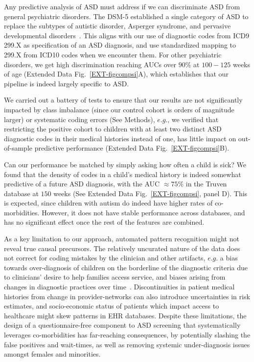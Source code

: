 \documentclass[3p,super,numbers,sort&compress,preprint,10pt]{elsarticle}
\def\treatment{positive\xspace}
\begin{document}
Any predictive analysis of ASD must address if we can
discriminate  ASD from  general psychiatric disorders.
The DSM-5 established a single category of ASD to replace
the subtypes of autistic disorder, Asperger syndrome, and pervasive
developmental disorders~\cite{hyman2020identification}. This aligns with our use of diagnostic codes from ICD9 299.X as specification of an ASD diagnosis, and use standardized mapping to 299.X from ICD10 codes when we encounter them. For other psychiatric disorders, we get  high discrimination reaching AUCs over $90\%$ at $100 -125$ weeks of age (Extended Data Fig.~\ref{EXT-figcompsi}A), which establishes that our pipeline is indeed largely specific to ASD.
%

We carried out a battery of tests to ensure that our results are not significantly impacted
by class imbalance (since our control cohort is orders of magnitude larger) or systematic coding errors (See Methods), $e.g.$, we verified that restricting the \treatment cohort to children with at least two  distinct ASD diagnostic codes in their medical histories instead of one, has little impact on  out-of-sample predictive performance (Extended Data Fig.~\ref{EXT-figcompsi}B).

 Can our performance be matched by simply asking how often a child is sick? We  found that the density of  codes in a child's medical history is indeed somewhat  predictive of a future ASD diagnosis, with the AUC  $\approx 75\%$ in the Truven database at $150$ weeks (See Extended Data Fig.~\ref{EXT-figcompsi}, panel D). This is expected, since children with autism do indeed have higher rates of co-morbidities. However, it does not have stable  performance across databases, and has no significant effect once the rest of the features are combined.
 
 As a key limitation to our approach, automated pattern recognition  might not reveal true causal precursors.
The relatively uncurated nature of the  data does not correct for coding mistakes by the clinician and other artifacts, $e.g.$   a bias towards over-diagnosis of  children on the borderline of the diagnostic criteria due to clinicians' desire to help families access service, and biases arising from changes in diagnostic practices over time~\cite{10.1001/jamapsychiatry.2019.1956}. Discontinuities in patient medical histories from change in provider-networks  can also introduce  uncertainties  in risk estimates, and socio-economic status of patients which impact access to healthcare  might skew patterns in EHR databases.
Despite these limitations, the design of a questionnaire-free component to ASD screening  that systematically leverages co-morbidities  has far-reaching consequences, by potentially slashing the false positives and wait-times, as well as removing systemic under-diagnosis issues amongst females and minorities. 
\end{document}
